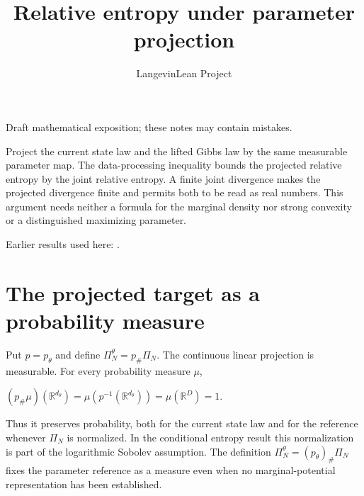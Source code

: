 \documentclass[11pt,a4paper]{article}
\title{\texorpdfstring{Relative entropy under parameter projection}{Relative entropy under parameter projection}}
\author{LangevinLean Project}
\date{}
\begin{document}
\maketitle
Draft mathematical exposition; these notes may contain mistakes.


Project the current state law and the lifted Gibbs law by the same measurable parameter map. The data-processing inequality bounds the projected relative entropy by the joint relative entropy. A finite joint divergence makes the projected divergence finite and permits both to be read as real numbers. This argument needs neither a formula for the marginal density nor strong convexity or a distinguished maximizing parameter.



Earlier results used here: \cite[Section~3.3]{LangevinLean2026IPLA}.

\section{\texorpdfstring{The projected target as a probability measure}{The projected target as a probability measure}}


Put \(p=p_\theta\) and define \(\Pi_N^\theta=p_\#\Pi_N\). The continuous linear projection is measurable. For every probability measure \(\mu\),



\((p_\#\mu)(\mathbb R^{d_\theta})=\mu(p^{-1}(\mathbb R^{d_\theta}))=\mu(\mathbb R^D)=1\).



Thus it preserves probability, both for the current state law and for the reference whenever \(\Pi_N\) is normalized. In the conditional entropy result this normalization is part of the logarithmic Sobolev assumption. The definition \(\Pi_N^\theta=(p_\theta)_\#\Pi_N\) fixes the parameter reference as a measure even when no marginal-potential representation has been established.
\end{document}
